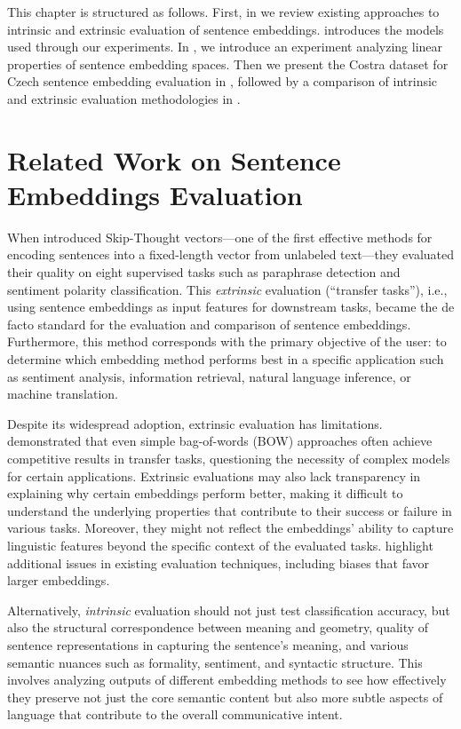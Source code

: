 This chapter is structured as follows. First, in  we review existing approaches to intrinsic and extrinsic evaluation of sentence embeddings.  introduces the models used through our experiments. In , we introduce an experiment analyzing linear properties of sentence embedding spaces. Then we present the Costra dataset for Czech sentence embedding evaluation in , followed by a comparison of intrinsic and extrinsic evaluation methodologies in .

\section{Related Work on Sentence Embeddings Evaluation}
\label{sentence_embeddings:rw}

When  introduced Skip-Thought vectors---one of the first effective methods for encoding sentences into a fixed-length vector from unlabeled text---they evaluated their quality on eight supervised tasks such as paraphrase detection and sentiment polarity classification. This \emph{extrinsic} evaluation (``transfer tasks''), i.e., using sentence embeddings as input features for downstream tasks, became the de facto standard for the evaluation and comparison of sentence embeddings. Furthermore, this method corresponds with the primary objective of the user: to determine which embedding method performs best in a specific application such as sentiment analysis, information retrieval, natural language inference, or machine translation.

Despite its widespread adoption, extrinsic evaluation has limitations. \cite{wieting2016iclr} demonstrated that even simple bag-of-words (BOW) approaches often achieve competitive results in transfer tasks, questioning the necessity of complex models for certain applications. Extrinsic evaluations may also lack transparency in explaining why certain embeddings perform better, making it difficult to understand the underlying properties that contribute to their success or failure in various tasks. Moreover, they might not reflect the embeddings' ability to capture linguistic features beyond the specific context of the evaluated tasks. \cite{pitfalls2019} highlight additional issues in existing evaluation techniques, including biases that favor larger embeddings.

Alternatively, \emph{intrinsic} evaluation should not just test classification accuracy, but also the structural correspondence between meaning and geometry, quality of sentence representations in capturing the sentence's meaning, and various semantic nuances such as formality, sentiment, and syntactic structure. This involves analyzing outputs of different embedding methods to see how effectively they preserve not just the core semantic content but also more subtle aspects of language that contribute to the overall communicative intent.

